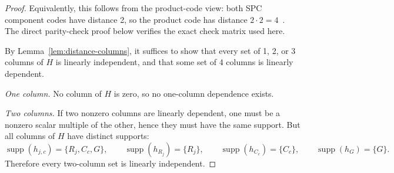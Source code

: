 \documentclass[11pt]{article}
\begin{document}
\begin{proof}
Equivalently, this follows from the product-code view: both SPC component codes have distance 2, so the product code has distance $2 \cdot 2 = 4$~\cite{elias1954}. The direct parity-check proof below verifies the exact check matrix used here.

By Lemma~\ref{lem:distance-columns}, it suffices to show that every set of 1, 2, or 3 columns of $H$ is linearly independent, and that some set of 4 columns is linearly dependent.

\textit{One column.} No column of $H$ is zero, so no one-column dependence exists.

\textit{Two columns.} If two nonzero columns are linearly dependent, one must be a nonzero scalar multiple of the other, hence they must have the same support. But all columns of $H$ have distinct supports:
\[
    \operatorname{supp}(h_{j,c}) = \{R_j, C_c, G\},\qquad
    \operatorname{supp}(h_{R_j}) = \{R_j\},\qquad
    \operatorname{supp}(h_{C_c}) = \{C_c\},\qquad
    \operatorname{supp}(h_G) = \{G\}.
\]
Therefore every two-column set is linearly independent.


\end{proof}
\end{document}
